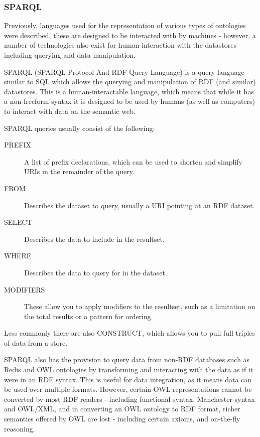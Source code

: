 \documentclass{article}
\begin{document}
\subsubsection{SPARQL}

Previously, languages used for the representation of various types of ontologies
were described, these are designed to be interacted with by machines - however,
a number of technologies also exist for human-interaction with the datastores
including querying and data manipulation.

SPARQL (SPARQL Protocol And RDF Query Language) is a query language similar to
SQL which allows the querying and manipulation of RDF (and similar) datastores.
This is a human-interactable language, which means that while it has a
non-freeform syntax it is designed to be used by humans (as well as computers)
to interact with data on the semantic web.

SPARQL queries usually consist of the following:

\begin{description}
    \item[PREFIX] A list of prefix declarations, which can be used to shorten
    and simplify URIs in the remainder of the query.
    \item[FROM] Describes the dataset to query, usually a URI pointing at an RDF
    dataset.
    \item[SELECT] Describes the data to include in the resultset.
    \item[WHERE] Describes the data to query for in the dataset.
    \item[MODIFIERS] These allow you to apply modifiers to the resultset, such
    as a limitation on the total results or a pattern for ordering.
\end{description}

Less commonly there are also CONSTRUCT, which allows you to pull full triples of
data from a store.

SPARQL also has the provision to query data from non-RDF databases such as Redis
and OWL ontologies by transforming and interacting with the data as if it were
in an RDF syntax. This is useful for data integration, as it means data can be
used over multiple formats. However, certain OWL representations cannot be
converted by most RDF readers - including functional syntax, Manchester syntax
and OWL/XML, and in converting an OWL ontology to RDF format, richer semantics
offered by OWL are lost - including certain axioms, and on-the-fly reasoning.
\end{document}
